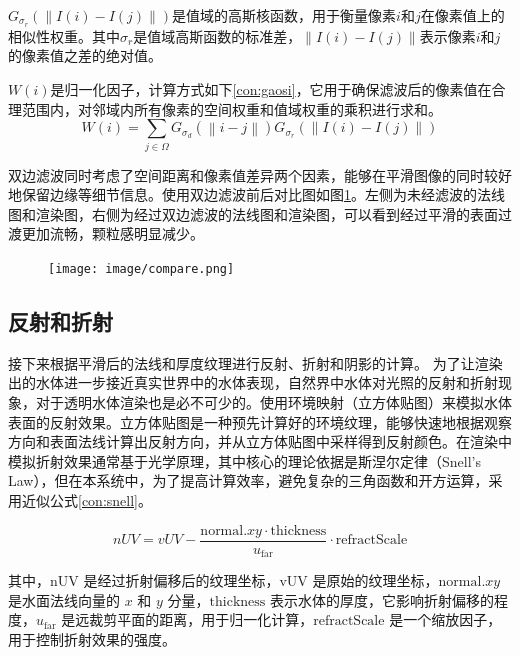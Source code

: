 $G_{\sigma_r}(\left \| I(i)-I(j) \right \|)$是值域的高斯核函数，用于衡量像素$i$和$j$在像素值上的相似性权重。其中$\sigma_r$是值域高斯函数的标准差，$\left \| I(i)-I(j) \right \|$表示像素$i$和$j$的像素值之差的绝对值。

$W(i)$是归一化因子，计算方式如下\ref{con:gaosi}，它用于确保滤波后的像素值在合理范围内，对邻域内所有像素的空间权重和值域权重的乘积进行求和。
\begin{equation}
    W(i)=\sum_{j\in\Omega}G_{\sigma_d}(\left \| i - j \right \|)G_{\sigma_r}(\left \| I(i)-I(j) \right \|)
    \label{con:gaosi}
\end{equation}

双边滤波同时考虑了空间距离和像素值差异两个因素，能够在平滑图像的同时较好地保留边缘等细节信息。使用双边滤波前后对比图如图\ref{fig:compare}。左侧为未经滤波的法线图和渲染图，右侧为经过双边滤波的法线图和渲染图，可以看到经过平滑的表面过渡更加流畅，颗粒感明显减少。

\begin{figure}[ht]
    \centering
    \texttt{[image: image/compare.png]}
    \label{fig:compare}
\end{figure}

\subsection{反射和折射}
接下来根据平滑后的法线和厚度纹理进行反射、折射和阴影的计算。
为了让渲染出的水体进一步接近真实世界中的水体表现，自然界中水体对光照的反射和折射现象，对于透明水体渲染也是必不可少的。使用环境映射（立方体贴图）来模拟水体表面的反射效果。立方体贴图是一种预先计算好的环境纹理，能够快速地根据观察方向和表面法线计算出反射方向，并从立方体贴图中采样得到反射颜色。在渲染中模拟折射效果通常基于光学原理，其中核心的理论依据是斯涅尔定律（Snell's Law），但在本系统中，为了提高计算效率，避免复杂的三角函数和开方运算，采用近似公式\ref{con:snell}。

\begin{equation}
    nUV = vUV - \frac{\text{normal}.xy \cdot \text{thickness}}{u_{\text{far}}} \cdot \text{refractScale}
    \label{con:snell}
\end{equation}

其中，$\text{nUV}$ 是经过折射偏移后的纹理坐标，$\text{vUV}$ 是原始的纹理坐标，$\text{normal}.xy$ 是水面法线向量的 $x$ 和 $y$ 分量，$\text{thickness}$ 表示水体的厚度，它影响折射偏移的程度，$u_{\text{far}}$ 是远裁剪平面的距离，用于归一化计算，$\text{refractScale}$ 是一个缩放因子，用于控制折射效果的强度。

